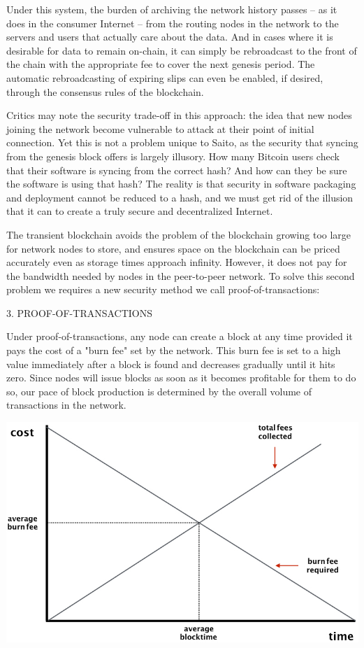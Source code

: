 \documentclass[11.5pt, oneside]{article}   	%
\begin{document}
\begin{multicols}{2}
Under this system, the burden of archiving the network history passes -- as it does in the consumer Internet -- from the routing nodes in the network to the servers and users that actually care about the data. And in cases where it is desirable for data to remain on-chain, it can simply be rebroadcast to the front of the chain with the appropriate fee to cover the next genesis period. The automatic rebroadcasting of expiring slips can even be enabled, if desired, through the consensus rules of the blockchain.

Critics may note the security trade-off in this approach: the idea that new nodes joining the network become vulnerable to attack at their point of initial connection. Yet this is not a problem unique to Saito, as the security that syncing from the genesis block offers is largely illusory. How many Bitcoin users check that their software is syncing from the correct hash? And how can they be sure the software is using that hash? The reality is that security in software packaging and deployment cannot be reduced to a hash, and we must get rid of the illusion that it can to create a truly secure and decentralized Internet.

The transient blockchain avoids the problem of the blockchain growing too large for network nodes to store, and ensures space on the blockchain can be priced accurately even as storage times approach infinity. However, it does not pay for the bandwidth needed by nodes in the peer-to-peer network. To solve this second problem we requires a new security method we call proof-of-transactions:

3. PROOF-OF-TRANSACTIONS

Under proof-of-transactions, any node can create a block at any time provided it pays the cost of a "burn fee" set by the network. This burn fee is set to a high value immediately after a block is found and decreases gradually until it hits zero. Since nodes will issue blocks as soon as it becomes profitable for them to do so, our pace of block production is determined by the overall volume of transactions in the network.

\includegraphics[width=.45\textwidth]{saito2.jpeg}


\end{multicols}
\end{document}
